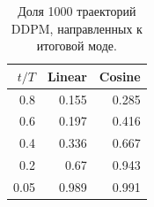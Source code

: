 \begin{table}[H]\centering\small
\setlength{\tabcolsep}{4pt}
\caption{Доля 1000 траекторий DDPM, направленных к итоговой моде.}\label{tab:trajectory}
\begin{tabular}{rrr}
\toprule
$t/T$ & Linear & Cosine \\
\midrule
0.8 & 0.155 & 0.285 \\
0.6 & 0.197 & 0.416 \\
0.4 & 0.336 & 0.667 \\
0.2 & 0.67 & 0.943 \\
0.05 & 0.989 & 0.991 \\
\bottomrule
\end{tabular}
\end{table}
